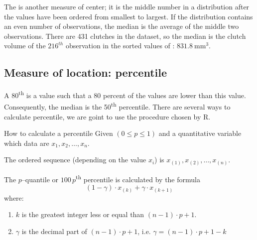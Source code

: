 The  is another measure of center; it is the middle number in a distribution after the values have been ordered from smallest to largest. If the distribution contains an even number of observations, the median is the average of the middle two observations. There are 431 clutches in the dataset, so the median is the clutch volume of the $216^{th}$ observation in the sorted values of : $831.8\ \textrm{mm}^{3}$.





\subsection{Measure of location: percentile}

A 80\textsuperscript{th}  is a value such that a  80 percent of  the values are lower than this value. Consequently, the median is the 50\textsuperscript{th} percentile. There are several ways to calculate percentile, we are goint to use the procedure chosen by R. 

\begin{onebox}{How to calculate a percentile}
  Given $(0\leq p \leq 1)$ and a quantitative variable which data are
$x_1, x_2, \ldots,x_n$. 

The ordered sequence (depending on the value $x_i$) is
$x_{(1)},x_{(2)}, \ldots, x_{(n)}$. 
  
The  $p$--quantile or  $100\,p$\textsuperscript{th} percentile is
calculated by the formula 
$$ (1-\gamma)\cdot x_{(k)} +\gamma \cdot x_{(k+1)}$$ 
where: 
\begin{enumerate}
  \item $k$ is the  greatest  integer less or equal than $(n-1)\cdot p+
  1$.\\
  \item $\gamma$ is the decimal part of   $(n-1)\cdot p+
  1$, i.e. $\gamma= (n-1)\cdot p+
  1-k$ 
\end{enumerate}

\end{onebox}

